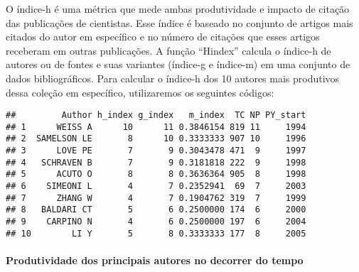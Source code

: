 \documentclass[]{article}
\newenvironment{Shaded}{\begin{snugshade}}{\end{snugshade}}
\newcommand{\DataTypeTok}[1]{\textcolor[rgb]{0.13,0.29,0.53}{#1}}
\newcommand{\DecValTok}[1]{\textcolor[rgb]{0.00,0.00,0.81}{#1}}
\newcommand{\KeywordTok}[1]{\textcolor[rgb]{0.13,0.29,0.53}{\textbf{#1}}}
\newcommand{\NormalTok}[1]{#1}
\newcommand{\OperatorTok}[1]{\textcolor[rgb]{0.81,0.36,0.00}{\textbf{#1}}}
\newcommand{\StringTok}[1]{\textcolor[rgb]{0.31,0.60,0.02}{#1}}
\let\oldparagraph\paragraph
\renewcommand{\paragraph}[1]{\oldparagraph{#1}\mbox{}}
\begin{document}
O índice-h é uma métrica que mede ambas produtividade e impacto de
citação das publicações de cientistas. Esse índice é baseado no conjunto
de artigos mais citados do autor em específico e no número de citações
que esses artigos receberam em outras publicações. A função ``Hindex''
calcula o índice-h de autores ou de fontes e suas variantes (índice-g e
índice-m) em uma conjunto de dados bibliográficos. Para calcular o
índice-h dos 10 autores mais produtivos dessa coleção em específico,
utilizaremos os seguintes códigos:

\begin{Shaded}
\end{Shaded}

\begin{verbatim}
##         Author h_index g_index   m_index  TC NP PY_start
## 1      WEISS A      10      11 0.3846154 819 11     1994
## 2  SAMELSON LE       8      10 0.3333333 907 10     1996
## 3      LOVE PE       7       9 0.3043478 471  9     1997
## 4   SCHRAVEN B       7       9 0.3181818 222  9     1998
## 5      ACUTO O       8       8 0.3636364 905  8     1998
## 6    SIMEONI L       4       7 0.2352941  69  7     2003
## 7      ZHANG W       4       7 0.1904762 319  7     1999
## 8   BALDARI CT       5       6 0.2500000 174  6     2000
## 9    CARPINO N       4       6 0.2500000 197  6     2004
## 10        LI Y       5       8 0.3333333 177  8     2005
\end{verbatim}

\hypertarget{produtividade-dos-principais-autores-no-decorrer-do-tempo}{%
\paragraph{Produtividade dos principais autores no decorrer do
tempo}\label{produtividade-dos-principais-autores-no-decorrer-do-tempo}}
\end{document}
